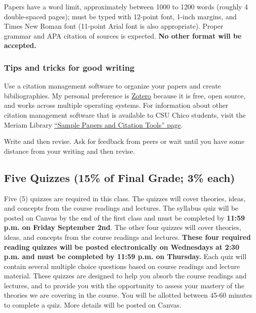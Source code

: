 \documentclass[11pt,]{article}
\begin{document}
Papers have a word limit, approximately between 1000 to 1200 words
(roughly 4 double-spaced pages); must be typed with 12-point font,
1-inch margins, and Times New Roman font (11-point Arial font is also
appropriate). Proper grammar and APA citation of sources is expected.
\textbf{No other format will be accepted.}

\hypertarget{tips-and-tricks-for-good-writing}{%
\subsubsection{Tips and tricks for good
writing}\label{tips-and-tricks-for-good-writing}}

Use a citation management software to organize your papers and create
bibiliographies. My personal preference is
\href{https://www.zotero.org/}{Zotero} because it is free, open source,
and works across multiple operating systems. For information about other
citation management software that is available to CSU Chico students,
visit the Meriam Library
\href{https://libguides.csuchico.edu/c.php?g=432300\&p=2948649}{``Sample
Papers and Citation Tools'' page}.

Write and then revise. Ask for feedback from peers or wait until you
have some distance from your writing and then revise.

\hypertarget{quizzes}{%
\subsection{Five Quizzes (15\% of Final Grade; 3\%
each)}\label{quizzes}}

Five (5) quizzes are required in this class. The quizzes will cover
theories, ideas, and concepts from the course readings and lectures. The
syllabus quiz will be posted on Canvas by the end of the first class and
must be completed by \textbf{11:59 p.m. on Friday September 2nd}. The
other four quizzes will cover theories, ideas, and concepts from the
course readings and lectures. \textbf{These four required reading
quizzes will be posted electronically on Wednesdays at 2:30 p.m. and
must be completed by 11:59 p.m. on Thursday.} Each quiz will contain
several multiple choice questions based on course readings and lecture
material. These quizzes are designed to help you absorb the course
readings and lectures, and to provide you with the opportunity to assess
your mastery of the theories we are covering in the course. You will be
allotted between 45-60 minutes to complete a quiz. More details will be
posted on Canvas.
\end{document}
